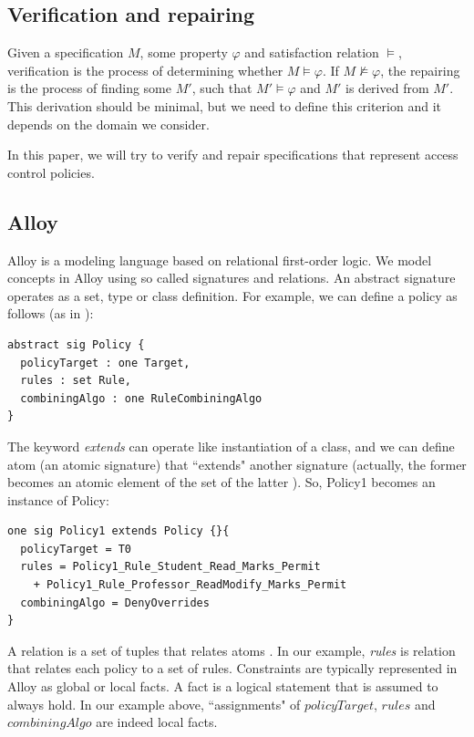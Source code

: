 \documentclass[letterpaper]{acm_proc_article-sp}
\begin{document}
\subsection{Verification and repairing}

Given a specification $M$, some property $\varphi$ and satisfaction relation $\models$, verification is the process of determining whether $M\models\varphi$. If $M\not\models\varphi$, the repairing is the process of finding some $M'$, such that $M'\models\varphi$ and $M'$ is derived from $M'$. This derivation should be minimal, but we need to define this criterion and it depends on the domain we consider.

In this paper, we will try to verify and repair specifications that represent access control policies.

\subsection{Alloy}
Alloy \cite{jackson:alloy} is a modeling language based on relational first-order logic. We model concepts in Alloy using so called signatures and relations. An abstract signature operates as a set, type or class definition. For example, we can define a policy as follows (as in \cite{acp:alloy}):
 
 \begin{verbatim}
abstract sig Policy {
  policyTarget : one Target,
  rules : set Rule,
  combiningAlgo : one RuleCombiningAlgo
} 
\end{verbatim}

The keyword \textit{extends} can operate like instantiation of a class, and we can define atom (an atomic signature) that ``extends" another signature (actually, the former becomes an atomic element of the set of the latter \cite{jackson:alloy}). So, Policy1 becomes an instance of Policy:

\begin{verbatim}
one sig Policy1 extends Policy {}{
  policyTarget = T0
  rules = Policy1_Rule_Student_Read_Marks_Permit 
    + Policy1_Rule_Professor_ReadModify_Marks_Permit
  combiningAlgo = DenyOverrides
}
\end{verbatim}

A relation is a set of tuples that relates atoms \cite{jackson:alloy}. In our example, \textit{rules} is relation that relates each policy to a set of rules. Constraints are typically represented in Alloy as global or local facts. A fact is a logical statement that is assumed to always hold. In our example above, ``assignments" of $policyTarget$, $rules$ and $combiningAlgo$ are indeed local facts.
\end{document}
